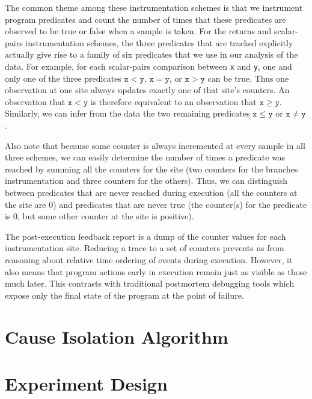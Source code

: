 \documentclass{sig-alternate}
\begin{document}
The common theme among these instrumentation schemes is that we
instrument program predicates and count the number of times that these
predicates are observed to be true or false when a sample is taken.   
For the returns and scalar-pairs instrumentation schemes, the three
predicates that are tracked explicitly actually give rise to a family
of six predicates that we use in our analysis of the data.
For example, for each scalar-pairs comparison between \texttt{x} and \texttt{y}, one and
only one of the three predicates $\mathtt{x} < \mathtt{y}$, $\mathtt{x} = \mathtt{y}$, or
$\mathtt{x} > \mathtt{y}$ can be true.  Thus one observation at one
site always updates exactly one of that site's counters.  An
observation that $\mathtt{x} < \mathtt{y}$ is therefore equivalent to
an observation that $\mathtt{x} \geq \mathtt{y}$.  Similarly, we can
infer from the data the two remaining predicates $\mathtt{x} \leq \mathtt{y}$ or
$\mathtt{x} \neq \mathtt{y}$.

Also note that because some counter is always incremented at every
sample in all three schemes, we can easily determine the number of
times a predicate was reached by summing all the counters for the site
(two counters for the branches instrumentation and three counters for
the others).  Thus, we can distinguish between predicates that are
never reached during execution (all the counters at the site are 0)
and predicates that are never true (the counter(s) for the predicate
is 0, but some other counter at the site is positive).

The post-execution feedback report is a dump of the counter values for
each instrumentation site.  Reducing a trace to a set of counters
prevents us from reasoning about relative time ordering of events
during execution.  However, it also means that program actions early
in execution remain just as visible as those much later.  This
contrasts with traditional postmortem debugging tools which expose
only the final state of the program at the point of failure.

\section{Cause Isolation Algorithm}
\label{sec:algorithm}


\section{Experiment Design}
\label{sec:experiments:setup}

\end{document}
